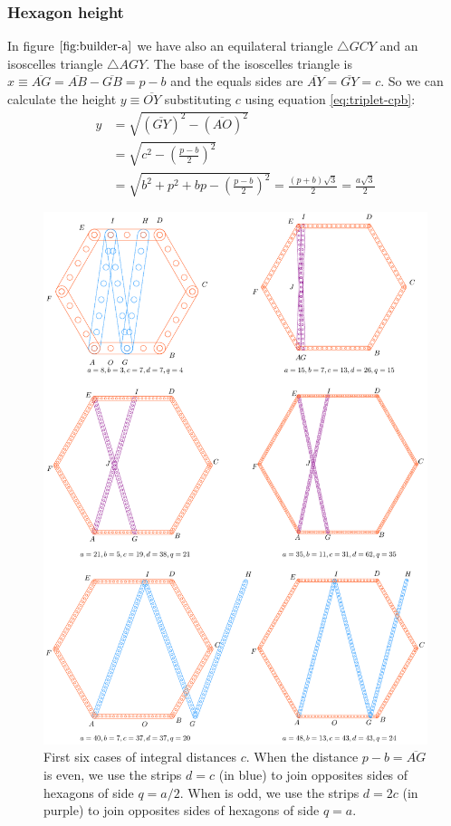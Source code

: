 \documentclass[11pt]{article}
\begin{document}
\subsubsection{Hexagon height}

In figure $\ref{fig:builder-a}$ we have also an equilateral triangle $\triangle{GCY}$ and an isoscelles triangle $\triangle{AGY}$. The base of the isoscelles triangle is $x \equiv \overline{AG} = \overline{AB} - \overline{GB} = p - b$ and the equals sides are $\overline{AY} = \overline{GY} = c$. So we can calculate the height $y \equiv \overline{OY}$ substituting $c$ using equation \ref{eq:triplet-cpb}:
\begin{align}
y &= \sqrt{(\overline{GY})^2 - (\overline{AO})^2} \nonumber\\
 &= \sqrt{c^2 - \left(\frac{p - b}2\right)^2} \nonumber\\
 &= \sqrt{b^2 + p^2 + bp - \left(\frac{p-b}2\right)^2}
  = \frac{(p + b)\sqrt3}2 = \frac{a\sqrt3}2
\end{align}


\begin{figure}[H]
\centering
\includegraphics[scale=0.8]{build/hexa-builder-b}
\caption{First six cases of integral distances $c$. When the distance $p-b = \overline{AG}$ is even, we use the strips $d = c$ (in blue) to join opposites sides of hexagons of side $q = a/2$. When is odd, we use the strips $d = 2c$ (in purple) to join opposites sides of hexagons of side $q = a$.}
\label{fig:builder-b}
\end{figure}
\end{document}
